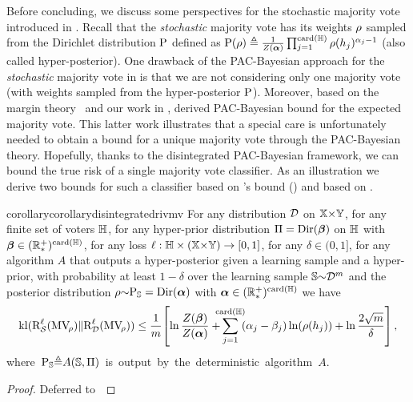 Before concluding, we discuss some perspectives for the stochastic majority vote introduced in .
Recall that the {\it stochastic} majority vote has its weights $\rho$ sampled from the Dirichlet distribution $\mathrm{P}$ defined as $\mathrm{P}(\rho) \triangleq \frac{1}{Z(\boldsymbol{\alpha})}\prod_{j=1}^{\operatorname{card}(\mathbb{H})}\rho(h_j)^{\alpha_j-1}$ (also called hyper-posterior).
One drawback of the PAC-Bayesian approach for the {\it stochastic} majority vote in  is that we are not considering only one majority vote (with weights sampled from the hyper-posterior $\mathrm{P}$).
Moreover, based on the margin theory~\citep[initiated by][]{SchapireFreundBarlettLee1998} and our work in , \citet{BiggsZantedeschiGuedj2022} derived PAC-Bayesian bound for the expected majority vote.
This latter work illustrates that a special care is unfortunately needed to obtain a bound for a unique majority vote through the PAC-Bayesian theory.
Hopefully, thanks to the disintegrated PAC-Bayesian framework, we can bound the true risk of a single majority vote classifier.
As an illustration we derive two bounds for such a classifier based on \citet{RivasplataKuzborskijSzepesvariShaweTaylor2020}'s bound () and based on .

\begin{restatable}{corollary}{corollarydisintegratedrivmv}\label{chap:dis-pra:corollary:disintegrated-riv-mv}
For any distribution $\mathcal{D}$ on $\mathbb{X}{\times}\mathbb{Y}$, for any finite set of voters $\mathbb{H}$, for any hyper-prior distribution $\Pi=\textrm{Dir}(\boldsymbol{\beta})$ on $\mathbb{H}$ with $\boldsymbol{\beta}\in(\mathbb{R}^{+}_{*})^{\operatorname{card}(\mathbb{H})}$, for any loss $\ell: \mathbb{H}\times(\mathbb{X}{\times}\mathbb{Y})\to [0,1]$, for any $\delta \in (0, 1]$, for any algorithm \mbox{$A$} that outputs a hyper-posterior given a learning sample and a hyper-prior, with probability at least $1{-}\delta$ over the learning sample $\mathbb{S}{\sim}\mathcal{D}^{m}$ and the posterior distribution $\rho{\sim} \mathrm{P}_{\mathbb{S}}=\textrm{Dir}(\boldsymbol{\alpha})$ with $\boldsymbol{\alpha}\in(\mathbb{R}^{+}_{*})^{\operatorname{card}(\mathbb{H})}$ we have
\begin{align*}
    \kl(\RiskLoss_{\dS}(\MVQ)\|\RiskLoss_{\D}(\MVQ)) \le \frac{1}{\m}\!\LB\ln\frac{Z(\paramDirP)}{Z(\paramDir)} + \!\!\!\!\sum_{j=1}^{\card(\H)}\!\!(\sparamDir_j-\sparamDirP_j)\ln(\Q(\h_j)) + \ln\frac{2\sqrt{\m}}{\delta}\RB,
\end{align*}
\mbox{where $\mathrm{P}_{\mathbb{S}}{\triangleq}A(\mathbb{S},\Pi)$ is output by the deterministic algorithm $A$}.
\end{restatable}
\begin{noaddcontents}\begin{proof}
Deferred to~
\end{proof}\end{noaddcontents}


